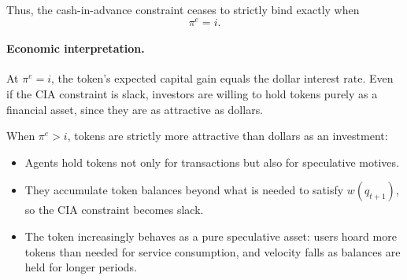 \documentclass[11pt, a4paper]{article}
\begin{document}
Thus, the cash-in-advance constraint ceases to strictly bind exactly when
\[
\boxed{\pi^e = i.}
\]

\paragraph{Economic interpretation.}

At \(\pi^e = i\), the token's expected capital gain equals the dollar interest rate.  
Even if the CIA constraint is slack, investors are willing to hold tokens purely as a financial asset, since they are as attractive as dollars.  

When \(\pi^e > i\), tokens are strictly more attractive than dollars as an investment:

\begin{itemize}
\item Agents hold tokens not only for transactions but also for speculative motives.
\item They accumulate token balances beyond what is needed to satisfy \(w(q_{t+1})\), so the CIA constraint becomes slack.
\item The token increasingly behaves as a pure speculative asset: users hoard more tokens than needed for service consumption, and velocity falls as balances are held for longer periods.
\end{itemize}
\end{document}
